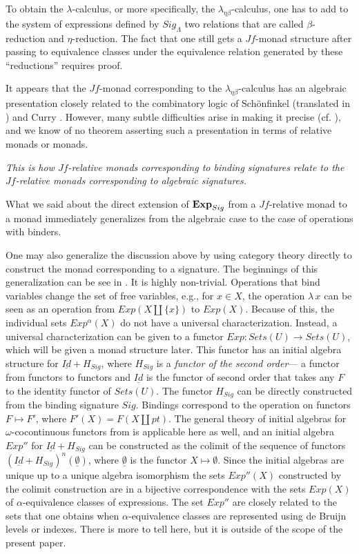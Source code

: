 \documentclass[12pt]{amsart}
\numberwithin{proposition}{subsection}
\newcommand{\sr}{\rightarrow}
\newcommand{\uu}{\underline}
\begin{document}
To obtain the $\lambda$-calculus, or more specifically, the
$\lambda_{\eta\beta}$-calculus, one has to add to the system of expressions
defined by $Sig_{\Lambda}$ two relations that are called $\beta$-reduction and 
$\eta$-reduction. The fact that one still gets a $Jf$-monad structure after
passing to equivalence classes under the equivalence relation generated by
these ``reductions'' requires proof.

It appears that the $Jf$-monad corresponding to the
$\lambda_{\eta\beta}$-calculus has an algebraic presentation closely related to
the combinatory logic of Schönfinkel \cite{Schonfinkel1924} (translated in
\cite{FtoG}) and Curry \cite{Curry1930}.  However, many subtle difficulties arise
in making it precise (cf.{} \cite{2002Selinger}), and we know of no theorem
asserting such a presentation in terms of relative monads or monads.

{\em This is how $Jf$-relative monads corresponding to binding signatures
  relate to the $Jf$-relative monads corresponding to algebraic signatures.}

What we said about the direct extension of ${\bf Exp}_{Sig}$ from a
$Jf$-relative monad to a monad immediately generalizes from the algebraic case
to the case of operations with binders.

One may also generalize the discussion above by using category theory directly
to construct the monad corresponding to a signature.  The beginnings
of this generalization can be see in \cite{FPT}. It is highly non-trivial.
Operations that bind variables change the set of free variables, e.g., for $x\in
X$, the operation $\lambda\,x$ can be seen as an operation from
$Exp(X\coprod\{x\})$ to $Exp(X)$. Because of this, the individual sets
$Exp^{\alpha}(X)$ do not have a universal characterization.  Instead, a universal
characterization can be given to a functor $Exp:Sets(U)\sr Sets(U)$, which will
be given a monad structure later.  This functor has an initial algebra structure
for $\uu{Id}+H_{Sig}$, where $H_{Sig}$ is a {\em functor of the second order}---%
a functor from functors to functors and $\uu{Id}$ is the functor of second
order that takes any $F$ to the identity functor of $Sets(U)$. The functor
$H_{Sig}$ can be directly constructed from the binding signature
$Sig$. Bindings correspond to the operation on functors $F\mapsto F'$, where
$F'(X)=F(X\coprod pt)$. The general theory of initial algebras for
$\omega$-cocontinuous functors from \cite{Adamek1974} is applicable here as
well, and an initial algebra $Exp''$ for $\uu{Id}+H_{Sig}$ can be constructed as
the colimit of the sequence of functors $(\uu{Id}+H_{Sig})^n(\uu{\emptyset})$,
where $\uu{\emptyset}$ is the functor $X\mapsto \emptyset$. Since the initial
algebras are unique up to a unique algebra isomorphism the sets $Exp''(X)$
constructed by the colimit construction are in a bijective correspondence with
the sets $Exp(X)$ of $\alpha$-equivalence classes of expressions. The set
$Exp''$ are closely related to the sets that one obtains when 
$\alpha$-equivalence classes are represented using de Bruijn levels or indexes. 
There is more
to tell here, but it is outside of the scope of the present
paper.
\end{document}
